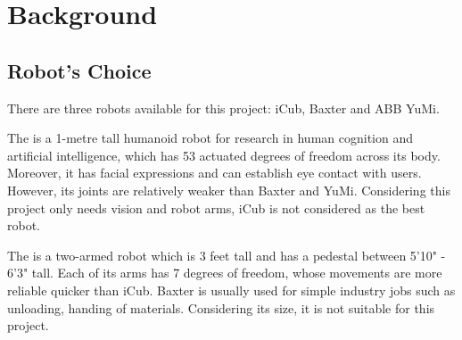 \chapter{Background}

\section{Robot's Choice}
There are three robots available for this project: iCub, Baxter and ABB YuMi.

The \citep{iCub} is a 1-metre tall humanoid robot for research in human cognition and artificial intelligence, which has 53 actuated degrees of freedom across its body. Moreover, it has facial expressions and can establish eye contact with users. However, its joints are relatively weaker than Baxter and YuMi. Considering this project only needs vision and robot arms, iCub is not considered as the best robot.

The \citep{baxter} is a two-armed robot which is 3 feet tall and has a pedestal between 5'10" - 6'3" tall. Each of its arms has 7 degrees of freedom, whose movements are more reliable quicker than iCub. Baxter is usually used for simple industry jobs such as unloading, handing of materials. Considering its size, it is not suitable for this project. 

